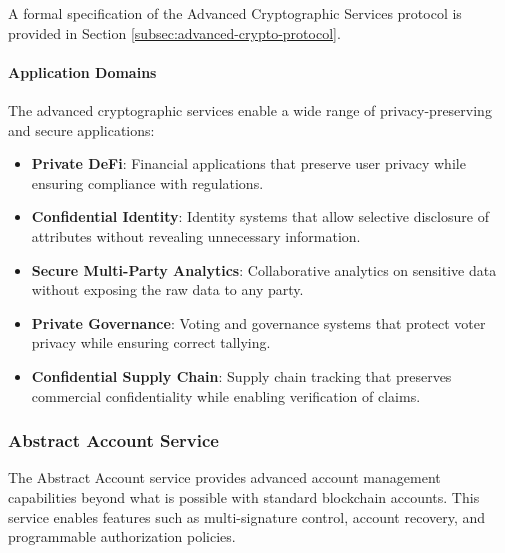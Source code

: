 \documentclass{article}
\begin{document}
A formal specification of the Advanced Cryptographic Services protocol is provided in Section \ref{subsec:advanced-crypto-protocol}.



\paragraph{Application Domains}
The advanced cryptographic services enable a wide range of privacy-preserving and secure applications:

\begin{itemize}
    \item \textbf{Private DeFi}: Financial applications that preserve user privacy while ensuring compliance with regulations.
    
    \item \textbf{Confidential Identity}: Identity systems that allow selective disclosure of attributes without revealing unnecessary information.
    
    \item \textbf{Secure Multi-Party Analytics}: Collaborative analytics on sensitive data without exposing the raw data to any party.
    
    \item \textbf{Private Governance}: Voting and governance systems that protect voter privacy while ensuring correct tallying.
    
    \item \textbf{Confidential Supply Chain}: Supply chain tracking that preserves commercial confidentiality while enabling verification of claims.
\end{itemize}

\subsubsection{Abstract Account Service}
\label{subsubsec:abstract-account}

The Abstract Account service provides advanced account management capabilities beyond what is possible with standard blockchain accounts. This service enables features such as multi-signature control, account recovery, and programmable authorization policies.


\end{document}
